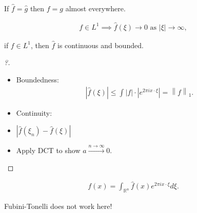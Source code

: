 \begin{proposition}[?]

If \(\widehat{f} = \widehat{g}\) then \(f=g\) almost everywhere.

\end{proposition}

\begin{proposition}

\begin{align*}
f\in L^1 \implies
\widehat{f}(\xi) \rightarrow 0 \text { as }|\xi| \rightarrow \infty
,\end{align*}

if \(f \in L^1\), then \(\widehat{f}\) is continuous and bounded.

\end{proposition}

\begin{proof}[?]

\envlist

\begin{itemize}
\item
  Boundedness:
  \begin{align*}
  {\left\lvert {\widehat{f}(\xi)} \right\rvert} 
  \leq \int {\left\lvert {f} \right\rvert}\cdot {\left\lvert {e^{2\pi i x\cdot \xi }} \right\rvert} 
  = {\left\lVert {f} \right\rVert}_{1}
  .\end{align*}
\item
  Continuity:
\item
  \({\left\lvert {\widehat{f}(\xi_{n}) - \widehat{f} (\xi) } \right\rvert}\)
\item
  Apply DCT to show \(a\overset{n\to\infty}\to 0\).
\end{itemize}

\end{proof}

\begin{theorem}

\begin{align*}
f(x)=\int_{\mathbb{R}^{n}} \widehat{f}(x) e^{2 \pi i x \cdot \xi} d \xi
.\end{align*}

\end{theorem}

\begin{warnings}

Fubini-Tonelli does not work here!

\end{warnings}

